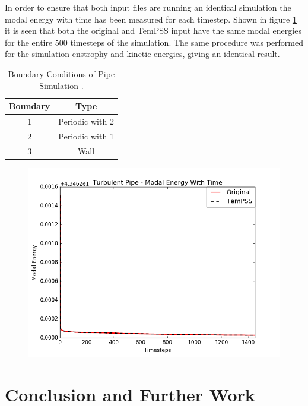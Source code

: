 \documentclass[11pt, a4paper]{report}
\begin{document}
In order to ensure that both input files are running an identical simulation the modal energy with time has been measured for each timestep. Shown in figure \ref{fig:pipe_modal} it is seen that both the original and TemPSS input have the same modal energies for the entire 500 timesteps of the simulation. The same procedure was performed for the simulation enstrophy and kinetic energies, giving an identical result.

\begin{table}[htb!]
	\centering
    \begin{tabular}{ c || c }
    \hline
    Boundary & Type \\
    \hline
    1 & Periodic with 2 \\
    2 & Periodic with 1\\
    3 & Wall \\
    \hline
    \end{tabular}
    \caption{Boundary Conditions of Pipe Simulation	.}
    \label{tab:pipe_boundaries}
\end{table}

\begin{figure}[htb!]
 \centering
 \includegraphics[width=.95\linewidth,  clip=true, trim = 0cm 0cm 0cm 0cm]{pipe_modal}
 \label{fig:pipe_modal}
\end{figure}

\chapter{Conclusion and Further Work}
\end{document}
